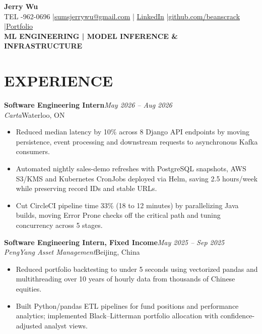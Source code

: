 \documentclass[11pt,letterpaper]{article}
\begin{document}
\begin{center}
  {\fontsize{16.7}{18}\selectfont\bfseries Jerry Wu}\\[-1pt]
  {\footnotesize TEL -962-0696 \enspace|\enspace \href{mailto:sumsjerrywu@gmail.com}{sumsjerrywu@gmail.com} \enspace|\enspace
  \href{https://www.linkedin.com/in/jerry-wu-03210a30b/}{LinkedIn} \enspace|\enspace \href{https://github.com/beanscrack}{github.com/beanscrack} \enspace|\enspace \href{https://website-beta-seven-81.vercel.app/}{Portfolio}}\\[1pt]
  {\fontsize{8.1}{9}\selectfont\bfseries ML ENGINEERING  |  MODEL INFERENCE & INFRASTRUCTURE}
\end{center}
\vspace{-5pt}
\section*{EXPERIENCE}
\noindent\textbf{Software Engineering Intern}\hfill \textit{May 2026 -- Aug 2026}\\
\textit{Carta}\hfill Waterloo, ON\par
\begin{itemize}
\item Reduced median latency by 10\% across 8 Django API endpoints by moving persistence, event processing and downstream requests to asynchronous Kafka consumers.
\item Automated nightly sales-demo refreshes with PostgreSQL snapshots, AWS S3/KMS and Kubernetes CronJobs deployed via Helm, saving 2.5 hours/week while preserving record IDs and stable URLs.
\item Cut CircleCI pipeline time 33\% (18 to 12 minutes) by parallelizing Java builds, moving Error Prone checks off the critical path and tuning concurrency across 5 stages.
\end{itemize}
\noindent\textbf{Software Engineering Intern, Fixed Income}\hfill \textit{May 2025 -- Sep 2025}\\
\textit{PengYang Asset Management}\hfill Beijing, China\par
\begin{itemize}
\item Reduced portfolio backtesting to under 5 seconds using vectorized pandas and multithreading over 10 years of hourly data from thousands of Chinese equities.
\item Built Python/pandas ETL pipelines for fund positions and performance analytics; implemented Black--Litterman portfolio allocation with confidence-adjusted analyst views.
\end{itemize}
\end{document}
